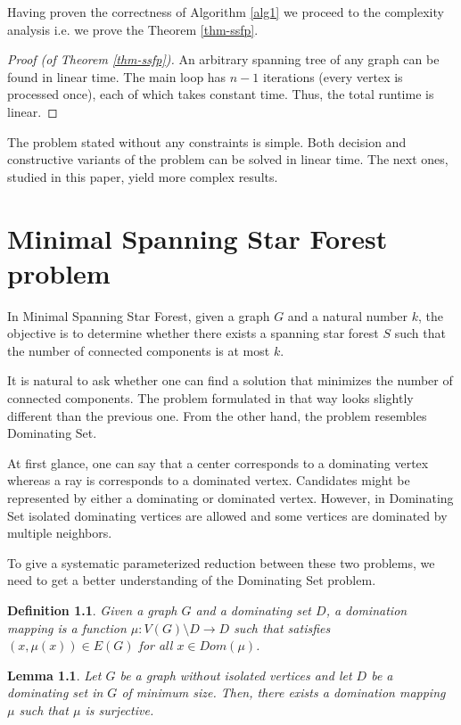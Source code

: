 \documentclass[en]{pracamgr}
\newtheorem{definition}{Definition}
\newtheorem{lemma}{Lemma}
\newcommand{\ssf}{spanning star forest}
\newcommand{\mssfp}{{\sc Minimal Spanning Star Forest}}
\newcommand{\domsetp}{{\sc Dominating Set}}
\begin{document}
Having proven the correctness of Algorithm \ref{alg1} we proceed to the complexity analysis i.e. we prove the Theorem \ref{thm-ssfp}.

\begin{proof}[Proof (of Theorem \ref{thm-ssfp})]
	An arbitrary spanning tree of any graph can be found in linear time. The main loop has $n-1$ iterations (every vertex is processed once), each of which takes constant time.
	Thus, the total runtime is linear.
\end{proof}

The problem stated without any constraints is simple. Both decision and constructive variants of the problem can be solved in linear time. The next ones, studied in this paper, yield more complex results.

\chapter{Minimal Spanning Star Forest problem}

In \mssfp{}, given a graph $G$ and a natural number $k$, the objective is to determine whether there exists a \ssf{} $S$ such that the number of connected components is at most $k$.

It is natural to ask whether one can find a solution that minimizes the number of connected components. The problem formulated in that way looks slightly different than the previous one. From the other hand, the problem resembles \domsetp{}.

At first glance, one can say that a center corresponds to a dominating vertex whereas a ray is corresponds to a dominated vertex. Candidates might be represented by either a dominating or dominated vertex. However, in \domsetp{} isolated dominating vertices are allowed and some vertices are dominated by multiple neighbors. 

To give a systematic parameterized reduction between these two problems, we need to get a better understanding of the \domsetp{} problem.

\begin{definition}
	Given a graph $G$ and a dominating set $D$, a {\normalfont domination mapping} is a function $\mu:V(G) \setminus D \rightarrow D$ such that satisfies $(x,\mu(x)) \in E(G)$ for all $x \in Dom(\mu)$.
\end{definition}

\begin{lemma}\label{dom mapping}
	Let $G$ be a graph without isolated vertices and let $D$ be a dominating set in $G$ of minimum size. Then, there exists a domination mapping $\mu$ such that $\mu$ is surjective.
\end{lemma}
\end{document}
